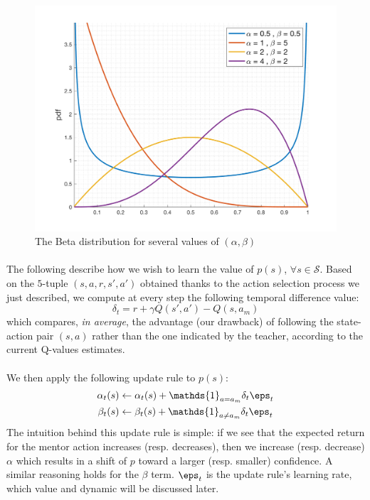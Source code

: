 \documentclass[a4paper]{report}
\begin{document}
{{{{		\begin{figure}[h!]
				\begin{center}
					\includegraphics[width=0.55\linewidth]{Beta_distribution_pdf.png}
					\caption{The Beta distribution for several values of $(\alpha,\beta)$}
				\end{center}
			\end{figure}
			
		\paragraph{}The following describe how we wish to learn the value of $p(s)$, $\forall s\in\mathcal{S}$. Based on the $5$-tuple $(s,a,r,s',a')$ obtained thanks to the action selection process we just described, we compute at every step the following temporal difference value: 
			\begin{equation}
				\delta_t = r + \gamma Q(s',a') - Q(s,a_m)
			\end{equation}
			which compares, \emph{in average}, the advantage (our drawback) of following the state-action pair $(s,a)$ rather than the one indicated by the teacher, according to the current Q-values estimates. 
		
			\paragraph{} We then apply the following update rule to $p(s)$: 
			\begin{equation}
				\label{eq::update_rule}
				\begin{aligned}
					\alpha_t(s) &\leftarrow \alpha_t(s) +  \mathds{1}_{a=a_m}\delta_t \eps_t\\
					\beta_t(s) &\leftarrow \beta_t(s) +   \mathds{1}_{a\neq a_m}\delta_t \eps_t
				\end{aligned}
			\end{equation}
			The intuition behind this update rule is simple: if we see that the expected return for the mentor action increases (resp. decreases), then we increase (resp. decrease) $\alpha$ which results in a shift of $p$ toward a larger (resp. smaller) confidence. A similar reasoning holds for the $\beta$ term.  $\eps_t$ is the update rule's learning rate, which value and dynamic will be discussed later. 
		
}}}}
\end{document}

